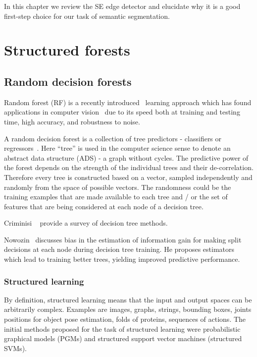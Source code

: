 In this chapter we review the SE edge detector and elucidate why it is a good first-step choice for our task of semantic segmentation.

\section{Structured forests}
\subsection*{Random decision forests}
Random forest (RF) is a recently introduced~\cite{Breiman01} learning approach which has found applications in computer vision~\cite{KontschiederBBP11,LimZD13,DollarICCV13edges,Dollar2014fast} due to its speed both at training and testing time, high accuracy, and robustness to noise.

A random decision forest is a collection %
of tree predictors - classifiers or regressors~\cite{breiman1984classification}. Here ``tree'' is used in the computer science sense to denote an abstract data structure (ADS) - a graph without cycles. 
The predictive power of the forest depends on the strength of the individual trees and their de-correlation. Therefore every tree is constructed based on a vector, sampled independently and randomly from the space of possible vectors. The randomness could be \wrt the training examples that are made available to each tree and / or the set of features that are being considered at each node of a decision tree.

Criminisi \etal~\cite{Criminisi12} provide a survey of decision tree methods.

Nowozin~\cite{Nowozin12improvedinformation,nowozin2014decision} discusses bias in the estimation of information gain for making split decisions at each node during decision tree training. He proposes estimators which lead to training better trees, yielding improved predictive performance.

\subsubsection*{Structured learning}
By definition, structured learning means that the input and output spaces can be arbitrarily complex. Examples are images, graphs, strings, bounding boxes, joints positions for object pose estimation, folds of proteins, sequences of actions. The initial methods proposed for the task of structured learning were probabilistic graphical models (PGMs) and structured support vector machines (structured SVMs).

